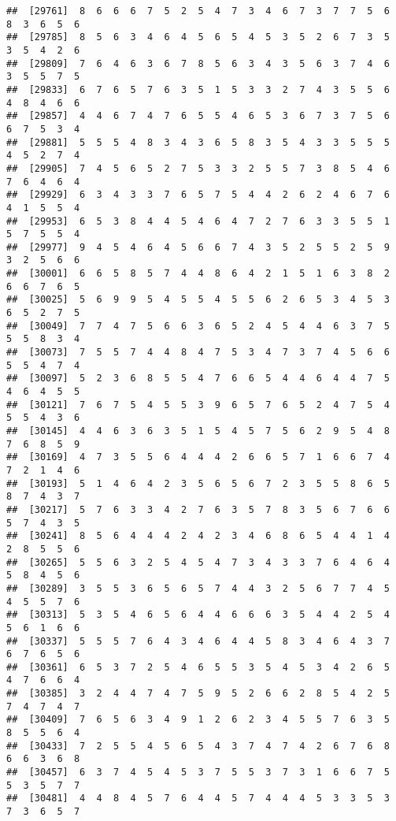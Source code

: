 \documentclass[
]{book}
\begin{document}
\begin{verbatim}
##  [29761]  8  6  6  6  7  5  2  5  4  7  3  4  6  7  3  7  7  5  6  8  3  6  5  6
##  [29785]  8  5  6  3  4  6  4  5  6  5  4  5  3  5  2  6  7  3  5  3  5  4  2  6
##  [29809]  7  6  4  6  3  6  7  8  5  6  3  4  3  5  6  3  7  4  6  3  5  5  7  5
##  [29833]  6  7  6  5  7  6  3  5  1  5  3  3  2  7  4  3  5  5  6  4  8  4  6  6
##  [29857]  4  4  6  7  4  7  6  5  5  4  6  5  3  6  7  3  7  5  6  6  7  5  3  4
##  [29881]  5  5  5  4  8  3  4  3  6  5  8  3  5  4  3  3  5  5  5  4  5  2  7  4
##  [29905]  7  4  5  6  5  2  7  5  3  3  2  5  5  7  3  8  5  4  6  7  6  4  6  4
##  [29929]  6  3  4  3  3  7  6  5  7  5  4  4  2  6  2  4  6  7  6  4  1  5  5  4
##  [29953]  6  5  3  8  4  4  5  4  6  4  7  2  7  6  3  3  5  5  1  5  7  5  5  4
##  [29977]  9  4  5  4  6  4  5  6  6  7  4  3  5  2  5  5  2  5  9  3  2  5  6  6
##  [30001]  6  6  5  8  5  7  4  4  8  6  4  2  1  5  1  6  3  8  2  6  6  7  6  5
##  [30025]  5  6  9  9  5  4  5  5  4  5  5  6  2  6  5  3  4  5  3  6  5  2  7  5
##  [30049]  7  7  4  7  5  6  6  3  6  5  2  4  5  4  4  6  3  7  5  5  5  8  3  4
##  [30073]  7  5  5  7  4  4  8  4  7  5  3  4  7  3  7  4  5  6  6  5  5  4  7  4
##  [30097]  5  2  3  6  8  5  5  4  7  6  6  5  4  4  6  4  4  7  5  4  6  4  5  5
##  [30121]  7  6  7  5  4  5  5  3  9  6  5  7  6  5  2  4  7  5  4  5  5  4  3  6
##  [30145]  4  4  6  3  6  3  5  1  5  4  5  7  5  6  2  9  5  4  8  7  6  8  5  9
##  [30169]  4  7  3  5  5  6  4  4  4  2  6  6  5  7  1  6  6  7  4  7  2  1  4  6
##  [30193]  5  1  4  6  4  2  3  5  6  5  6  7  2  3  5  5  8  6  5  8  7  4  3  7
##  [30217]  5  7  6  3  3  4  2  7  6  3  5  7  8  3  5  6  7  6  6  5  7  4  3  5
##  [30241]  8  5  6  4  4  4  2  4  2  3  4  6  8  6  5  4  4  1  4  2  8  5  5  6
##  [30265]  5  5  6  3  2  5  4  5  4  7  3  4  3  3  7  6  4  6  4  5  8  4  5  6
##  [30289]  3  5  5  3  6  5  6  5  7  4  4  3  2  5  6  7  7  4  5  4  5  5  7  6
##  [30313]  5  3  5  4  6  5  6  4  4  6  6  6  3  5  4  4  2  5  4  5  6  1  6  6
##  [30337]  5  5  5  7  6  4  3  4  6  4  4  5  8  3  4  6  4  3  7  6  7  6  5  6
##  [30361]  6  5  3  7  2  5  4  6  5  5  3  5  4  5  3  4  2  6  5  4  7  6  6  4
##  [30385]  3  2  4  4  7  4  7  5  9  5  2  6  6  2  8  5  4  2  5  7  4  7  4  7
##  [30409]  7  6  5  6  3  4  9  1  2  6  2  3  4  5  5  7  6  3  5  8  5  5  6  4
##  [30433]  7  2  5  5  4  5  6  5  4  3  7  4  7  4  2  6  7  6  8  6  6  3  6  8
##  [30457]  6  3  7  4  5  4  5  3  7  5  5  3  7  3  1  6  6  7  5  5  3  5  7  7
##  [30481]  4  4  8  4  5  7  6  4  4  5  7  4  4  4  5  3  3  5  3  7  3  6  5  7

\end{verbatim}
\end{document}
